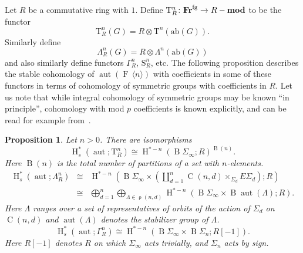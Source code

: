 \documentclass[psamsfonts]{amsart}
\theoremstyle{plain}
\newtheorem{prop}[thm]{Proposition}
\theoremstyle{definition}
\theoremstyle{remark}
\newcommand{\catname}[1]{{\normalfont\textbf{#1}}}
\newcommand{\fr}{\allfr^{\mathrm{fg}}}
\newcommand{\allfr}{\catname{Fr}}
\newcommand{\module}{\catname{mod}}
\newcommand{\aut}{\operatorname{aut}}
\newcommand{\classifying}{\operatorname{B}}
\newcommand{\free}[1]{\operatorname{F}\,\langle #1\rangle}
\newcommand{\HH}{\operatorname{H}} %
\newcommand{\abelianization}{\mathrm{ab}}
\newcommand{\tensor}{\mathrm{T}}
\newcommand{\symm}{\mathrm{S}}
\DeclareMathOperator{\Part}{\rho}
\DeclareMathOperator{\Comp}{C}
\DeclareMathOperator{\Bell}{B}
\begin{document}
Let $R$ be a commutative ring with $1$. Define $\tensor^n_R\colon \fr\to R-\module$ to be the functor
\[
\tensor^n_R(G)=R\otimes \tensor^n(\abelianization(G)).
\]
Similarly define
\[
\Lambda^n_R(G)=R\otimes \Lambda^n (\abelianization(G))
\]
and also similarly define functors $\Gamma^n_R$, $\symm^n_R$, etc. The following proposition describes the stable cohomology of $\aut(\free{n})$ with coefficients in some of these functors in terms of cohomology of symmetric groups with coefficients in $R$. Let us note that while integral cohomology of symmetric groups may be known ``in principle'', cohomology with mod $p$ coefficients is known explicitly, and can be read for example from~\cite{Cohen-Lada-May}.
\begin{prop}\label{prop:stable cohomology calculations}
Let $n>0$. There are isomorphisms
\begin{equation}\label{item:stable tensor}
\HH^*_s(\aut; \tensor^n_R)\cong \HH^{*-n}\left({\classifying\Sigma_\infty} ; R\right)^{\Bell(n)}.
\end{equation}
Here $\Bell(n)$ is the total number of partitions of a set with $n$-elements.
\begin{eqnarray}\label{item:stable exterior}
 \HH^*_s(\aut; \Lambda^n_R) & \cong & \HH^{*-n}\left({\classifying\Sigma_\infty}\times \left(\coprod_{d=1}^n \Comp(n, d)\times_{\Sigma_d} E\Sigma_d \right); R\right) \\ \nonumber &\cong & \bigoplus_{d=1}^n\bigoplus_{\Lambda\in\Part(n, d)}\HH^{*-n}(\classifying\Sigma_\infty \times \classifying\aut(\Lambda);R).  
\end{eqnarray}
Here $\Lambda$ ranges over a set of representatives of orbits of the action of $\Sigma_d$ on $\Comp(n, d)$ and $\aut(\Lambda)$ denotes the stabilizer group of $\Lambda$.
\begin{equation} \label{item:stable Gamma}
  \HH^*_s(\aut; \Gamma^n_R) \cong  \HH^{*-n}\left({\classifying \Sigma_\infty}\times\classifying \Sigma_n;R[-1]\right) .
\end{equation}
Here $R[-1]$ denotes $R$ on which $\Sigma_\infty$ acts trivially, and $\Sigma_n$ acts by sign.
\end{prop}
\end{document}
